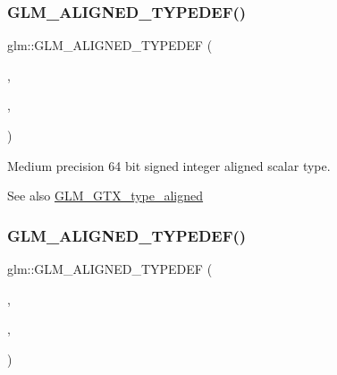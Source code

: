\subsubsection{\texorpdfstring{G\+L\+M\+\_\+\+A\+L\+I\+G\+N\+E\+D\+\_\+\+T\+Y\+P\+E\+D\+E\+F()}{GLM\_ALIGNED\_TYPEDEF()}\hspace{0.1cm}{\footnotesize\ttfamily [16/209]}}
{\footnotesize\ttfamily glm\+::\+G\+L\+M\+\_\+\+A\+L\+I\+G\+N\+E\+D\+\_\+\+T\+Y\+P\+E\+D\+EF (\begin{DoxyParamCaption}\item[{\hyperlink{group__gtc__type__precision_ga603c695fe5cd677d3f72a81343e19a74}{mediump\+\_\+int64}}]{,  }\item[{aligned\+\_\+mediump\+\_\+int64}]{,  }\item[{8}]{ }\end{DoxyParamCaption})}

Medium precision 64 bit signed integer aligned scalar type. \begin{DoxySeeAlso}{See also}
\hyperlink{group__gtx__type__aligned}{G\+L\+M\+\_\+\+G\+T\+X\+\_\+type\+\_\+aligned} 
\end{DoxySeeAlso}
\mbox{\label{group__gtx__type__aligned_ga353fd9fa8a9ad952fcabd0d53ad9a6dd}} 
\subsubsection{\texorpdfstring{G\+L\+M\+\_\+\+A\+L\+I\+G\+N\+E\+D\+\_\+\+T\+Y\+P\+E\+D\+E\+F()}{GLM\_ALIGNED\_TYPEDEF()}\hspace{0.1cm}{\footnotesize\ttfamily [17/209]}}
{\footnotesize\ttfamily glm\+::\+G\+L\+M\+\_\+\+A\+L\+I\+G\+N\+E\+D\+\_\+\+T\+Y\+P\+E\+D\+EF (\begin{DoxyParamCaption}\item[{\hyperlink{group__gtc__type__precision_ga626ac5f73d3538e62a879d6c56abfb36}{mediump\+\_\+int8\+\_\+t}}]{,  }\item[{aligned\+\_\+mediump\+\_\+int8\+\_\+t}]{,  }\item[{1}]{ }\end{DoxyParamCaption})}

